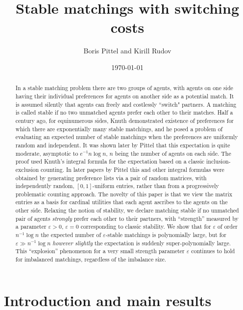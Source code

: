 \documentclass[11pt]{amsart}
\date{\today}
\def\eps{\varepsilon}
\theoremstyle{remark}
\numberwithin{equation}{section}
\begin{document}
\title[Stable Matchings]{Stable matchings with switching costs}

\author {Boris Pittel and Kirill Rudov}
\address{Department of Mathematics, Ohio State University}
\address{Department of Economics, University of California, Berkeley}
\maketitle

\begin{abstract} In a stable matching problem there are two groups of agents, with agents on one side having their individual preferences for agents on another side as a potential match. It is assumed silently that agents can freely and costlessly ``switch" partners. A matching is called stable if no two unmatched agents prefer each other to their matches. Half a century ago, for equinumerous sides, Knuth demonstrated existence of preferences for which there are exponentially many stable matchings, and he posed a problem of evaluating an expected number of stable matchings when the preferences are uniformly random and independent. It was shown later by Pittel that this expectation is quite moderate, asymptotic to $e^{-1}n\log n$, $n$ being the number of agents on each side. The proof used Knuth's integral formula for the expectation based on a classic inclusion-exclusion counting. In later papers by Pittel this and other integral formulas were obtained by generating preference lists via a pair of random matrices, with independently random, $[0,1]$-uniform entries, rather than from a progressively problematic counting approach. The novelty of this paper is that we view the matrix entries as a basis for cardinal utilities that each agent ascribes to the agents on the other side. Relaxing the notion of stability, we declare matching stable if no unmatched pair of agents {\it strongly\/} prefer each other to their partners, with ``strength'' measured by a parameter $\eps>0$, $\eps=0$ corresponding to classic stability. We show that 
for $\eps$ of order $n^{-1}\log n$ the expected number of $\eps$-stable matchings is polynomially large, but 
for $\eps\gg n^{-1}\log n$ {\it however slightly\/} the expectation is suddenly super-polynomially large. This ``explosion'' phenomenon for a very small strength parameter $\eps$ continues to hold for imbalanced matchings, regardless of the imbalance size.
\end{abstract}

\section{Introduction and main results}
\end{document}
